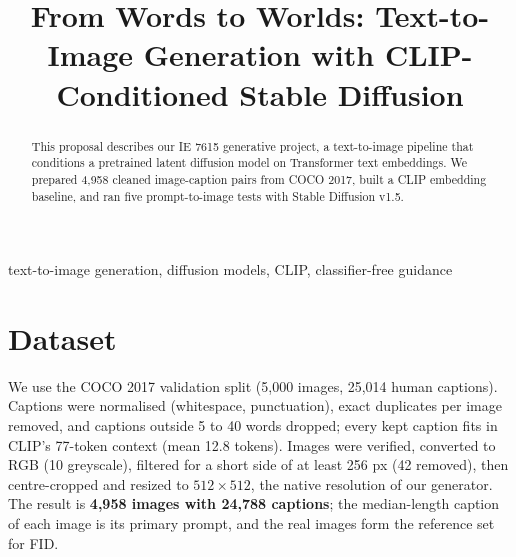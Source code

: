 \documentclass[conference]{IEEEtran}
\begin{document}
\title{From Words to Worlds: Text-to-Image Generation with CLIP-Conditioned Stable Diffusion}

\author{
\and
{}
\and
{}
}

\maketitle

\begin{abstract}
This proposal describes our IE 7615 generative project, a text-to-image pipeline that conditions a pretrained latent
diffusion model on Transformer text embeddings. We prepared 4,958 cleaned image-caption pairs from COCO 2017, built a
CLIP embedding baseline, and ran five prompt-to-image tests with Stable Diffusion v1.5.
\end{abstract}

\begin{IEEEkeywords}
text-to-image generation, diffusion models, CLIP, classifier-free guidance
\end{IEEEkeywords}

\section{Dataset}
We use the COCO 2017 validation split (5,000 images, 25,014 human captions). Captions were normalised (whitespace,
punctuation), exact duplicates per image removed, and captions outside 5 to 40 words dropped; every kept caption fits
in CLIP's 77-token context (mean 12.8 tokens). Images were verified, converted to RGB (10 greyscale), filtered for a
short side of at least 256 px (42 removed), then centre-cropped and resized to $512\times512$, the native resolution of
our generator. The result is \textbf{4,958 images with 24,788 captions}; the median-length caption of each image is
its primary prompt, and the real images form the reference set for FID.
\end{document}
